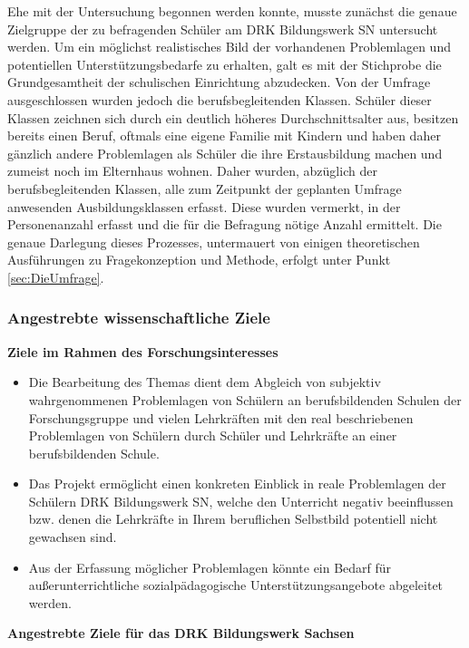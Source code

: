 Ehe mit der Untersuchung begonnen werden konnte, musste zunächst die genaue Zielgruppe der zu befragenden Schüler am DRK Bildungswerk SN untersucht werden. Um ein möglichst realistisches Bild der vorhandenen Problemlagen und potentiellen Unterstützungsbedarfe zu erhalten, galt es mit der Stichprobe die Grundgesamtheit der schulischen Einrichtung abzudecken. Von der Umfrage ausgeschlossen wurden jedoch die berufsbegleitenden Klassen. Schüler dieser Klassen zeichnen sich durch ein deutlich höheres Durchschnittsalter aus, besitzen bereits einen Beruf, oftmals eine eigene Familie mit Kindern und haben daher gänzlich andere Problemlagen als Schüler die ihre Erstausbildung machen und zumeist noch im Elternhaus wohnen. Daher wurden, abzüglich der berufsbegleitenden Klassen, alle zum Zeitpunkt der geplanten Umfrage anwesenden Ausbildungsklassen erfasst. Diese wurden vermerkt, in der Personenanzahl erfasst und die für die Befragung nötige Anzahl ermittelt. Die genaue Darlegung dieses Prozesses, untermauert von einigen theoretischen Ausführungen zu Fragekonzeption und Methode, erfolgt unter Punkt \ref{sec:DieUmfrage}. 

\subsubsection{Angestrebte wissenschaftliche Ziele}
\label{sec:AngestrebteWissenschaftlicheZiele}

\textbf{Ziele im Rahmen des Forschungsinteresses}

\begin{itemize}
	\item Die Bearbeitung des Themas dient dem Abgleich von subjektiv wahrgenommenen Problemlagen von Schülern an berufsbildenden Schulen der Forschungsgruppe und vielen Lehrkräften mit den real beschriebenen Problemlagen von Schülern durch Schüler und Lehrkräfte an einer berufsbildenden Schule.
	\item Das Projekt ermöglicht einen konkreten Einblick in reale Problemlagen der Schülern DRK Bildungswerk SN, welche den Unterricht negativ beeinflussen bzw. denen die Lehrkräfte in Ihrem beruflichen Selbstbild potentiell nicht gewachsen sind.
	\item Aus der Erfassung möglicher Problemlagen könnte ein Bedarf für außerunterrichtliche sozialpädagogische Unterstützungsangebote abgeleitet werden.
\end{itemize}

\noindent
\textbf{Angestrebte Ziele für das DRK Bildungswerk Sachsen}
 
